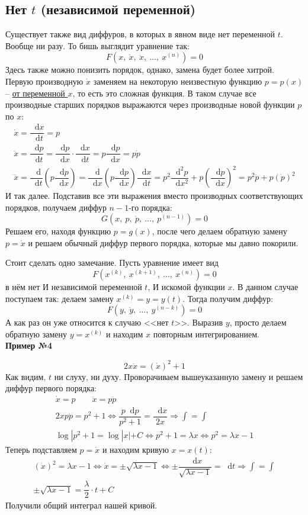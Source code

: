 \documentclass[a4paper,12pt]{article}
\renewcommand*\d{\mathop{}\!\mathrm{d}}
\newcommand{\dy}{\dot{y}}
\newcommand{\dpp}{\dot{p}}
\newcommand{\ddpp}{\ddot{p}}
\newcommand{\dx}{\dot{x}}
\newcommand{\ddx}{\ddot{x}}
\newcommand{\dddx}{\dddot{x}}
\newcommand{\bto}{\Longrightarrow}
\newcommand{\ds}{\displaystyle}
\begin{document}
\subsection{Нет $t$ (независимой переменной)}

Существует также вид диффуров, в которых в явном виде нет переменной $t$. Вообще ни разу. То бишь выглядит уравнение так:
\[F\left(x,\ \dx,\ \ddx,\ \ldots,\ x^{(n)}\right) = 0\]
Здесь также можно понизить порядок, однако, замена будет более хитрой. Первую производную $\dx$ заменяем на некоторую неизвестную функцию $p = p(x)$ -- \underline{от переменной $x$}, то есть это сложная функция. В таком случае все производные старших порядков выражаются через производные новой функции $p$ по $x$:
\begin{gather*}
	\dx = \dfrac{\d x}{\d t} = p\\
	\ddx = \dfrac{\d p}{\d t} = \dfrac{\d p}{\d x} \cdot \dfrac{\d x}{\d t} = p\dfrac{\d p}{\d x} = p\dpp\\
	\dddx = \dfrac{\d}{\d t}\left(p\dfrac{\d p}{\d x}\right) = \dfrac{\d }{\d x}\left(p\dfrac{\d p}{\d x}\right)\dfrac{\d x}{\d t} = p^2\dfrac{\d^2p}{\d x^2} + p\left(\dfrac{\d p}{\d x}\right)^2 = p^2\ddpp + p(\dpp)^2
\end{gather*}
И так далее. Подставив все эти выражения вместо производных соответствующих порядков, получаем диффур $n - 1$-го порядка:
\[G\left(x,\ p,\ \dpp,\ \ldots,\ p^{(n - 1)}\right) = 0\]
Решаем его, находя функцию $p = g(x)$, после чего делаем обратную замену $p = \dx$ и решаем обычный диффур первого порядка, которые мы давно покорили.

Стоит сделать одно замечание. Пусть уравнение имеет вид
\[F\left(x^{(k)},\ x^{(k + 1)},\ \ldots,\ x^{(n)}\right) = 0\]
в нём нет И независимой переменной $t$, И искомой функции $x$. В данном случае поступаем так: делаем замену $x^{(k)} = y = y(t)$. Тогда получим диффур:
\[F\left(y,\ \dy,\ \ldots,\ y^{(n - k)}\right) = 0\]
А как раз он уже относится к случаю <<нет $t$>>. Выразив $y$, просто делаем обратную замену $y = x^{(k)}$ и находим $x$ повторным интегрированием.
\ \\

\textbf{Пример №4}

\[2x\ddx = (\dx)^2 + 1\]
Как видим, $t$ ни слуху, ни духу. Проворачиваем вышеуказанную замену и решаем диффур первого порядка:
\begin{gather*}
	\dx = p\qquad\ddx = p\ddpp \\
	2xp\ddpp = p^2 + 1 \iff \dfrac{p\d p}{p^2 + 1} = \dfrac{\d x}{2x} \bto \ds\int = \int \\
	\log|p^2 + 1 = \log|x| + C \iff p^2 + 1 = \lambda x \iff p^2 = \lambda x - 1
\end{gather*}
Теперь подставляем $p = \dx$ и находим кривую $x = x(t)$:
\begin{gather*}
	(\dx)^2 = \lambda x - 1 \iff \dx = \pm\sqrt{\lambda x - 1} \iff \pm\dfrac{\d x}{\sqrt{\lambda x - 1}} = \d t \bto \ds\int = \int\\
	\pm\sqrt{\lambda x - 1} = \dfrac{\lambda}{2} \cdot t + C
\end{gather*}
Получили общий интеграл нашей кривой.
\ \\
\end{document}

